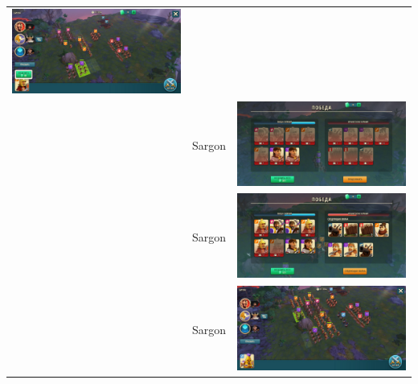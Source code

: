\begin{longtable}{|c|c|c|}
    \includegraphics[width=0.75\linewidth]{./parts/media/TreasureHunt/38/sargon/photo_2022-04-07_13-17-31.jpg} \\
    & Sargon &
    \includegraphics[width=0.75\linewidth]{./parts/media/TreasureHunt/38/sargon/photo_2022-04-07_13-17-35.jpg} \\
    & Sargon &
    \includegraphics[width=0.75\linewidth]{./parts/media/TreasureHunt/38/sargon/photo_2022-04-07_13-17-28.jpg} \\
    & Sargon &
    \includegraphics[width=0.75\linewidth]{./parts/media/TreasureHunt/38/sargon/photo_2022-04-07_13-17-20.jpg} \\

\end{longtable}
